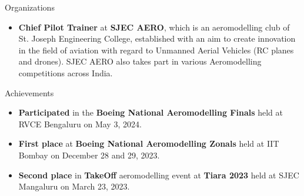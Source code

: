 \documentclass{resume} %
\begin{document}
\begin{rSection}{Organizations} 
    \begin{itemize}
        \item 	\textbf{Chief Pilot Trainer} at \textbf{SJEC AERO}, which is an aeromodelling club of St. Joseph Engineering College, established with an aim to
        create innovation in the field of aviation with regard to Unmanned Aerial Vehicles (RC planes and
        drones). SJEC AERO also takes part in various Aeromodelling competitions across India.
        
        
    
    \end{itemize}
    
    
\end{rSection}


\begin{rSection}{Achievements} 
    \begin{itemize}
        \item 	\textbf{Participated} in the \textbf{Boeing National Aeromodelling Finals} held at RVCE Bengaluru on May 3, 2024.
 
        \item 	\textbf{First place} at \textbf{Boeing National Aeromodelling Zonals} held at IIT Bombay on December 28 and 29, 2023.
        \item 	\textbf{Second place} in \textbf{TakeOff} aeromodelling event at \textbf{Tiara 2023} held at SJEC Mangaluru on March 23, 2023.
        
        
    
    \end{itemize}
    
    
    \end{rSection}
\end{document}
